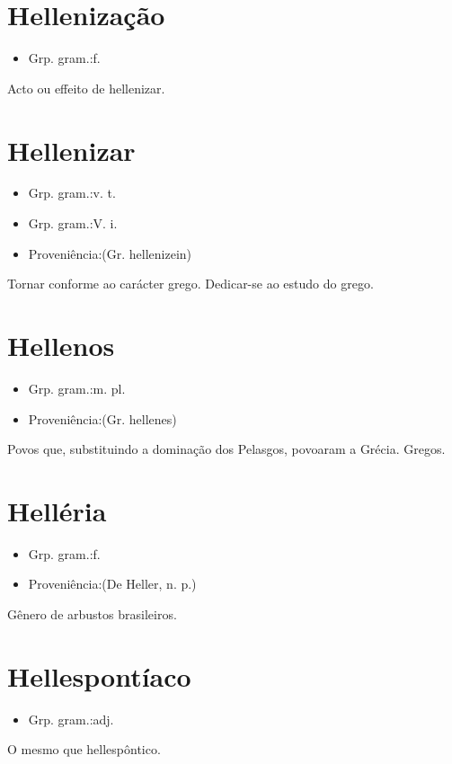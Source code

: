 \documentclass{article}
\begin{document}
\section{Hellenização}
\begin{itemize}
\item {Grp. gram.:f.}
\end{itemize}
Acto ou effeito de hellenizar.
\section{Hellenizar}
\begin{itemize}
\item {Grp. gram.:v. t.}
\end{itemize}
\begin{itemize}
\item {Grp. gram.:V. i.}
\end{itemize}
\begin{itemize}
\item {Proveniência:(Gr. \textunderscore hellenizein\textunderscore )}
\end{itemize}
Tornar conforme ao carácter grego.
Dedicar-se ao estudo do grego.
\section{Hellenos}
\begin{itemize}
\item {Grp. gram.:m. pl.}
\end{itemize}
\begin{itemize}
\item {Proveniência:(Gr. \textunderscore hellenes\textunderscore )}
\end{itemize}
Povos que, substituindo a dominação dos Pelasgos, povoaram a Grécia.
Gregos.
\section{Helléria}
\begin{itemize}
\item {Grp. gram.:f.}
\end{itemize}
\begin{itemize}
\item {Proveniência:(De \textunderscore Heller\textunderscore , n. p.)}
\end{itemize}
Gênero de arbustos brasileiros.
\section{Hellespontíaco}
\begin{itemize}
\item {Grp. gram.:adj.}
\end{itemize}
O mesmo que \textunderscore hellespôntico\textunderscore .
\end{document}

